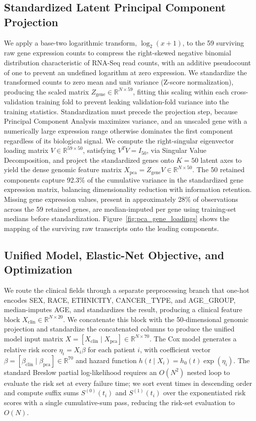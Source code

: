 \documentclass[sigconf, review=true]{acmart}
\begin{document}
\subsection{Standardized Latent Principal Component Projection}
We apply a base-two logarithmic transform, $\log_2(x + 1)$, to the 59 surviving raw gene expression counts to compress the right-skewed negative binomial distribution characteristic of RNA-Seq read counts, with an additive pseudocount of one to prevent an undefined logarithm at zero expression. We standardize the transformed counts to zero mean and unit variance (Z-score normalization), producing the scaled matrix $Z_{\text{gene}} \in \mathbb{R}^{N \times 59}$, fitting this scaling within each cross-validation training fold to prevent leaking validation-fold variance into the training statistics. Standardization must precede the projection step, because Principal Component Analysis maximizes variance, and an unscaled gene with a numerically large expression range otherwise dominates the first component regardless of its biological signal. We compute the right-singular eigenvector loading matrix $V \in \mathbb{R}^{59 \times 50}$, satisfying $V^T V = I_{50}$, via Singular Value Decomposition, and project the standardized genes onto $K = 50$ latent axes to yield the dense genomic feature matrix $X_{\text{pca}} = Z_{\text{gene}} V \in \mathbb{R}^{N \times 50}$. The 50 retained components capture 92.3\% of the cumulative variance in the standardized gene expression matrix, balancing dimensionality reduction with information retention. Missing gene expression values, present in approximately 28\% of observations across the 59 retained genes, are median-imputed per gene using training-set medians before standardization. Figure~\ref{fig:pca_gene_loadings} shows the mapping of the surviving raw transcripts onto the leading components.

\subsection{Unified Model, Elastic-Net Objective, and Optimization}
We route the clinical fields through a separate preprocessing branch that one-hot encodes SEX, RACE, ETHNICITY, CANCER\_TYPE, and AGE\_GROUP, median-imputes AGE, and standardizes the result, producing a clinical feature block $X_{\text{clin}} \in \mathbb{R}^{N \times 20}$. We concatenate this block with the 50-dimensional genomic projection and standardize the concatenated columns to produce the unified model input matrix $X = [X_{\text{clin}} \mid X_{\text{pca}}] \in \mathbb{R}^{N \times 70}$. The Cox model generates a relative risk score $\eta_i = X_i \beta$ for each patient $i$, with coefficient vector $\beta = [\beta_{\text{clin}} \mid \beta_{\text{pca}}] \in \mathbb{R}^{70}$ and hazard function $h(t \mid X_i) = h_0(t) \exp(\eta_i)$. The standard Breslow partial log-likelihood \cite{breslow1972discussion} requires an $O(N^2)$ nested loop to evaluate the risk set at every failure time; we sort event times in descending order and compute suffix sums $S^{(0)}(t_i)$ and $S^{(1)}(t_i)$ over the exponentiated risk scores with a single cumulative-sum pass, reducing the risk-set evaluation to $O(N)$.
\end{document}
